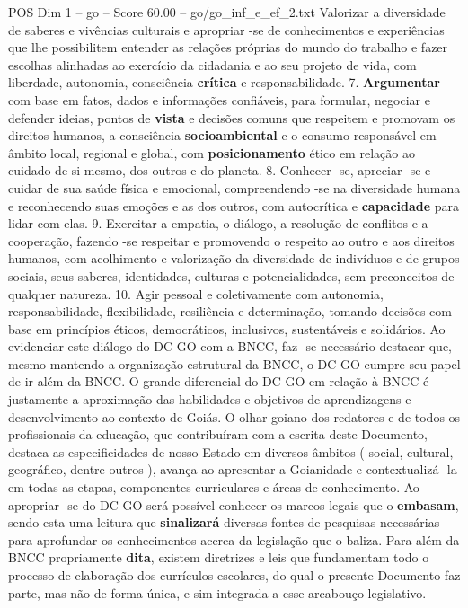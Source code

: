 \begin{textsample}{POS Dim 1 – go – Score 60.00 – go/go\_inf\_e\_ef\_2.txt}
Valorizar a diversidade de saberes e vivências culturais e apropriar -se de conhecimentos e experiências que lhe possibilitem entender as relações próprias do mundo do trabalho e fazer escolhas alinhadas ao exercício da cidadania e ao seu projeto de vida, com liberdade, autonomia, consciência \textbf{crítica} e responsabilidade. 7. \textbf{Argumentar} com base em fatos, dados e informações confiáveis, para formular, negociar e defender ideias, pontos de \textbf{vista} e decisões comuns que respeitem e promovam os direitos humanos, a consciência \textbf{socioambiental} e o consumo responsável em âmbito local, regional e global, com \textbf{posicionamento} ético em relação ao cuidado de si mesmo, dos outros e do planeta. 8.
Conhecer -se, apreciar -se e cuidar de sua saúde física e emocional, compreendendo -se na diversidade humana e reconhecendo suas emoções e as dos outros, com autocrítica e \textbf{capacidade} para lidar com elas. 9.
Exercitar a empatia, o diálogo, a resolução de conflitos e a cooperação, fazendo -se respeitar e promovendo o respeito ao outro e aos direitos humanos, com acolhimento e valorização da diversidade de indivíduos e de grupos sociais, seus saberes, identidades, culturas e potencialidades, sem preconceitos de qualquer natureza. 10.
Agir pessoal e coletivamente com autonomia, responsabilidade, flexibilidade, resiliência e determinação, tomando decisões com base em princípios éticos, democráticos, inclusivos, sustentáveis e solidários.
Ao evidenciar este diálogo do DC-GO com a BNCC, faz -se necessário destacar que, mesmo mantendo a organização estrutural da BNCC, o DC-GO cumpre seu papel de ir além da BNCC.
O grande diferencial do DC-GO em relação à BNCC é justamente a aproximação das habilidades e objetivos de aprendizagens e desenvolvimento ao contexto de Goiás.
O olhar goiano dos redatores e de todos os profissionais da educação, que contribuíram com a escrita deste Documento, destaca as especificidades de nosso Estado em diversos âmbitos ( social, cultural, geográfico, dentre outros ), avança ao apresentar a Goianidade e contextualizá -la em todas as etapas, componentes curriculares e áreas de conhecimento.
Ao apropriar -se do DC-GO será possível conhecer os marcos legais que o \textbf{embasam}, sendo esta uma leitura que \textbf{sinalizará} diversas fontes de pesquisas necessárias para aprofundar os conhecimentos acerca da legislação que o baliza.
Para além da BNCC propriamente \textbf{dita}, existem diretrizes e leis que fundamentam todo o processo de elaboração dos currículos escolares, do qual o presente Documento faz parte, mas não de forma única, e sim integrada a esse arcabouço legislativo.

\end{textsample}
